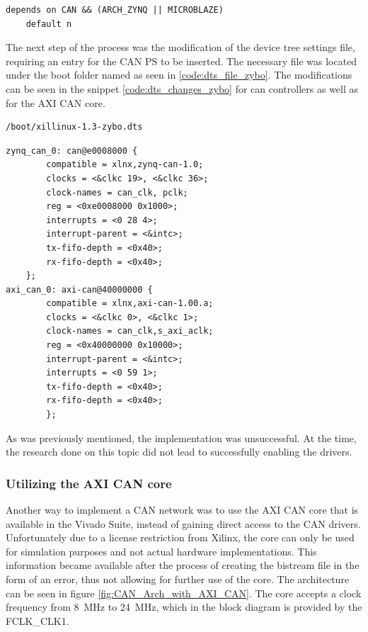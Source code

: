 \begin{lstlisting}[firstnumber=130,caption={Original content of lines 130 and 131.},label=code:can_kconfig_original_line130]
	depends on CAN && (ARCH_ZYNQ || MICROBLAZE)
	default n
\end{lstlisting}

The next step of the process was the modification of the device tree settings file, requiring an entry for the CAN PS to be inserted.
The necessary file was located under the boot folder named as seen in \ref{code:dts_file_zybo}.
The modifications can be seen in the snippet \ref{code:dts_changes_zybo} for can controllers as well as for the AXI CAN core.

\begin{lstlisting}[numbers=none,caption={Device tree settings file and its path.},label=code:dts_file_zybo]
/boot/xillinux-1.3-zybo.dts
\end{lstlisting}
\begin{lstlisting}[caption={Device tree settings changes.},label=code:dts_changes_zybo]
zynq_can_0: can@e0008000 {
        compatible = xlnx,zynq-can-1.0;
        clocks = <&clkc 19>, <&clkc 36>;
        clock-names = can_clk, pclk;
        reg = <0xe0008000 0x1000>;
        interrupts = <0 28 4>;
        interrupt-parent = <&intc>;
        tx-fifo-depth = <0x40>;
        rx-fifo-depth = <0x40>;
    };
axi_can_0: axi-can@40000000 {
        compatible = xlnx,axi-can-1.00.a;
        clocks = <&clkc 0>, <&clkc 1>;
        clock-names = can_clk,s_axi_aclk;
        reg = <0x40000000 0x10000>;
        interrupt-parent = <&intc>;
        interrupts = <0 59 1>;
        tx-fifo-depth = <0x40>;
        rx-fifo-depth = <0x40>;
        };
\end{lstlisting}

As was previously mentioned, the implementation was unsuccessful. At the time, the research done on this topic did not lead to successfully enabling the drivers.

\subsubsection{Utilizing the AXI CAN core}

Another way to implement a CAN network was to use the AXI CAN core that is available in the Vivado Suite, instead of gaining direct access to the CAN drivers.
Unfortunately due to a license restriction from Xilinx, the core can only be used for simulation purposes and not actual hardware implementations.
This information became available after the process of creating the bistream file in the form of an error, thus not allowing for further use of the core.
The architecture can be seen in figure \ref{fig:CAN_Arch_with_AXI_CAN}.
The core accepts a clock frequency from \SI{8}{\mega\hertz} to \SI{24}{\mega\hertz}, which in the block diagram is provided by the FCLK\_CLK1.

